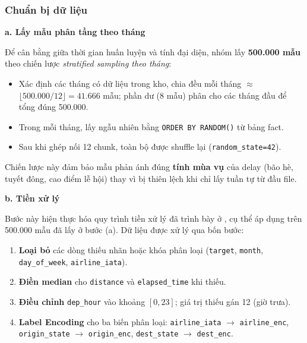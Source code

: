 \subsubsection{Chuẩn bị dữ liệu}

\noindent \textbf{a. Lấy mẫu phân tầng theo tháng}

Để cân bằng giữa thời gian huấn luyện và tính đại diện,
nhóm lấy \textbf{500.000 mẫu} theo chiến lược \textit{stratified sampling theo tháng}:

\begin{itemize}
    \item Xác định các tháng có dữ liệu trong kho, chia đều mỗi tháng $\approx$ $\lfloor 500{.}000 / 12 \rfloor = 41{.}666$ mẫu;
          phần dư (8 mẫu) phân cho các tháng đầu để tổng đúng 500.000.
    \item Trong mỗi tháng, lấy ngẫu nhiên bằng \texttt{ORDER BY RANDOM()} từ bảng fact.
    \item Sau khi ghép nối 12 chunk, toàn bộ được shuffle lại (\texttt{random\_state=42}).
\end{itemize}

Chiến lược này đảm bảo mẫu phản ánh đúng \textbf{tính mùa vụ} của delay
(bão hè, tuyết đông, cao điểm lễ hội) thay vì bị thiên lệch
khi chỉ lấy tuần tự từ đầu file.

\noindent \textbf{b. Tiền xử lý}

Bước này hiện thực hóa quy trình tiền xử lý đã trình bày ở ,
cụ thể áp dụng trên 500.000 mẫu đã lấy ở bước (a).
Dữ liệu được xử lý qua bốn bước:
\begin{enumerate}
    \item \textbf{Loại bỏ} các dòng thiếu nhãn hoặc khóa phân loại
          (\texttt{target}, \texttt{month}, \texttt{day\_of\_week}, \texttt{airline\_iata}).
    \item \textbf{Điền median} cho \texttt{distance} và \texttt{elapsed\_time} khi thiếu.
    \item \textbf{Điều chỉnh} \texttt{dep\_hour} vào khoảng $[0, 23]$; giá trị thiếu gán 12 (giờ trưa).
    \item \textbf{Label Encoding} cho ba biến phân loại:
          \texttt{airline\_iata} $\rightarrow$ \texttt{airline\_enc},
          \texttt{origin\_state} $\rightarrow$ \texttt{origin\_enc},
          \texttt{dest\_state} $\rightarrow$ \texttt{dest\_enc}.
\end{enumerate}

